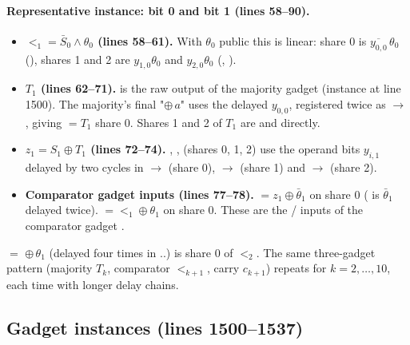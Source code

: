 \paragraph{Representative instance: bit 0 and bit 1 (lines 58--90).}\leavevmode\par

\begin{itemize}
  \item \textbf{$\lt_1 = \bar S_0 \wedge \theta_0$ (lines 58--61).} With $\theta_0$ public this is linear: share 0 is $\overline{y_{0,0}}\,\theta_0$ (), shares 1 and 2 are $y_{1,0}\theta_0$ and $y_{2,0}\theta_0$ (, ).
  \item \textbf{$T_1$ (lines 62--71).}  is the raw output of the majority gadget  (instance at line 1500). The majority's final "$\oplus\, a$" uses the delayed $y_{0,0}$, registered twice as $\to$, giving  $= T_1$ share 0. Shares 1 and 2 of $T_1$ are  and  directly.
  \item \textbf{$z_1 = S_1 \oplus T_1$ (lines 72--74).} , ,  (shares 0, 1, 2) use the operand bits $y_{i,1}$ delayed by two cycles in $\to$ (share 0), $\to$ (share 1) and $\to$ (share 2).
  \item \textbf{Comparator gadget inputs (lines 77--78).}  $= z_1 \oplus \bar\theta_1$ on share 0 ( is $\bar\theta_1$ delayed twice).  $= \lt_1 \oplus \theta_1$ on share 0. These are the / inputs of the comparator gadget .
\end{itemize}


 $= $  $\oplus\,\theta_1$ (delayed four times in ..) is share 0 of $\lt_2$. The same three-gadget pattern (majority $T_k$, comparator $\lt_{k+1}$, carry $c_{k+1}$) repeats for $k = 2, \dots, 10$, each time with longer delay chains.

\subsection{Gadget instances (lines 1500--1537)}\label{app:v-gadgets}



